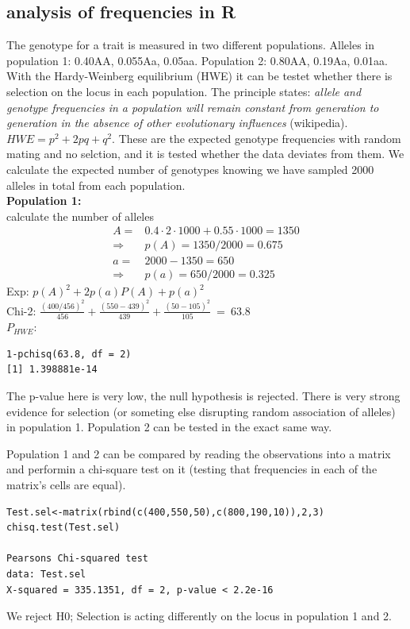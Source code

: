\documentclass{article}
\begin{document}
\subsection{analysis of frequencies in R}
The genotype for a trait is measured in two different populations. Alleles in population 1: 0.40AA, 0.055Aa, 0.05aa. Population 2: 0.80AA, 0.19Aa, 0.01aa. With the Hardy-Weinberg equilibrium (HWE) it can be testet whether there is selection on the locus in each population. The principle states: \textit{allele and genotype frequencies in a population will remain constant from generation to generation in the absence of other evolutionary influences} (wikipedia). $HWE = p^2+2pq+q^2$. These are the expected genotype frequencies with random mating and no selction, and it is tested whether the data deviates from them. We calculate the expected number of genotypes knowing we have sampled 2000 alleles in total from each population.\\
\textbf{Population 1:}\\
calculate the number of alleles
\begin{equation*}
\begin{split}
    A  = & 0.4 \cdot 2 \cdot 1000 + 0.55 \cdot 1000 = 1350  \\
     \Rightarrow& p(A) = 1350/2000 = 0.675\\
    a  =& 2000-1350 = 650 \\
    \Rightarrow& p(a) = 650/2000 = 0.325
\end{split}
\end{equation*}
Exp: $p(A)^2 + 2p(a)P(A) + p(a)^2$ \\
Chi-2: $\frac{(400/456)^2}{456} + \frac{(550-439)^2}{439} + \frac{(50-105)^2}{105} \: = \: 63.8$\\
$P_{HWE}:$
\begin{lstlisting}
1-pchisq(63.8, df = 2)
[1] 1.398881e-14
\end{lstlisting}
The p-value here is very low, the null hypothesis is rejected. There is very strong evidence for selection (or someting else disrupting random association of alleles) in population 1. Population 2 can be tested in the exact same way.\par
Population 1 and 2 can be compared  by reading the observations into a matrix and performin a chi-square test on it (testing that frequencies in each of the matrix's cells are equal).
\begin{lstlisting}
Test.sel<-matrix(rbind(c(400,550,50),c(800,190,10)),2,3)
chisq.test(Test.sel)

Pearsons Chi-squared test
data: Test.sel
X-squared = 335.1351, df = 2, p-value < 2.2e-16
\end{lstlisting}
We reject H0; Selection is acting differently on the locus in population 1 and 2.
\end{document}
